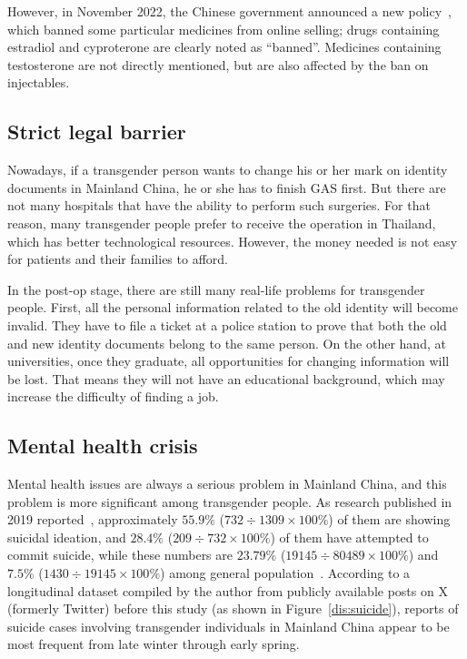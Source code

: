 \documentclass{article}
\begin{document}
		However, in November 2022, the Chinese government announced a new policy~\cite{Gov2022}, which banned some particular medicines from online selling; drugs containing estradiol and cyproterone are clearly noted as ``banned''. Medicines containing testosterone are not directly mentioned, but are also affected by the ban on injectables.

		\subsection{Strict legal barrier}
		Nowadays, if a transgender person wants to change his or her mark on identity documents in Mainland China, he or she has to finish GAS first. But there are not many hospitals that have the ability to perform such surgeries. For that reason, many transgender people prefer to receive the operation in Thailand, which has better technological resources. However, the money needed is not easy for patients and their families to afford.

		In the post-op stage, there are still many real-life problems for transgender people. First, all the personal information related to the old identity will become invalid. They have to file a ticket at a police station to prove that both the old and new identity documents belong to the same person. On the other hand, at universities, once they graduate, all opportunities for changing information will be lost. That means they will not have an educational background, which may increase the difficulty of finding a job.

		\subsection{Mental health crisis}\label{sec:crisis}
		Mental health issues are always a serious problem in Mainland China, and this problem is more significant among transgender people. As research published in 2019 reported~\cite{Chen_2019}, approximately \(55.9\%\) (\(732 \div 1309 \times 100\%\)) of them are showing suicidal ideation, and \(28.4\%\) (\(209 \div 732 \times 100\%\)) of them have attempted to commit suicide, while these numbers are \(23.79\%\) (\(19145 \div 80489 \times 100\%\)) and \(7.5\%\) (\(1430 \div 19145 \times 100\%\)) among general population~\cite{Sun_2023}. According to a longitudinal dataset compiled by the author from publicly available posts on X (formerly Twitter) before this study (as shown in Figure~\ref{dis:suicide}), reports of suicide cases involving transgender individuals in Mainland China appear to be most frequent from late winter through early spring.
\end{document}
